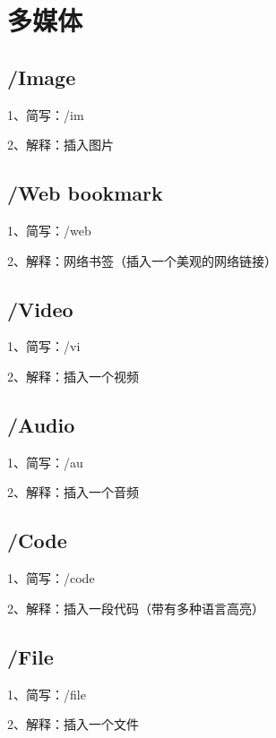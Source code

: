 \chapter{多媒体}

\section{/Image}

1、简写：/im

2、解释：插入图片

\section{/Web bookmark}

1、简写：/web

2、解释：网络书签（插入一个美观的网络链接）

\section{/Video}

1、简写：/vi

2、解释：插入一个视频

\section{/Audio}

1、简写：/au

2、解释：插入一个音频

\section{/Code}

1、简写：/code

2、解释：插入一段代码（带有多种语言高亮）

\section{/File}

1、简写：/file

2、解释：插入一个文件

